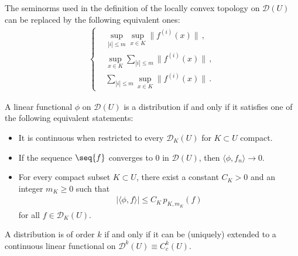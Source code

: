     \begin{property}
        The seminorms used in the definition of the locally convex topology on $\mathcal{D}(U)$ can be replaced by the following equivalent ones:
        \begin{gather}
            \label{distribution:D_seminorm}
            \begin{cases}
                &\sup_{|i|\leq m}\sup_{x\in K}\|f^{(i)}(x)\|\,,\\
                &\sup_{x\in K}\sum_{|i|\leq m}\|f^{(i)}(x)\|\,,\\
                &\sum_{|i|\leq m}\sup_{x\in K}\|f^{(i)}(x)\|\,.
            \end{cases}
        \end{gather}
    \end{property}

	\begin{property}
		A linear functional $\phi$ on $\mathcal{D}(U)$ is a distribution if and only if it satisfies one of the following equivalent statements:
		\begin{itemize}
            \item It is continuous when restricted to every $\mathcal{D}_K(U)$ for $K\subset U$ compact.
			\item If the sequence $\seq{f}$ converges to 0 in $\mathcal{D}(U)$, then $\langle\phi,f_n\rangle\longrightarrow0$.
			\item For every compact subset $K\subset U$, there exist a constant $C_K>0$ and an integer $m_K\geq0$ such that
			\begin{gather}
				|\langle\phi,f\rangle|\leq C_K\,p_{K,m_K}(f)
			\end{gather}
			for all $f\in\mathcal{D}_K(U)$.
		\end{itemize}
	\end{property}


	\begin{property}
		A distribution is of order $k$ if and only if it can be (uniquely) extended to a continuous linear functional on $\mathcal{D}^k(U)\equiv C^k_c(U)$.
	\end{property}

